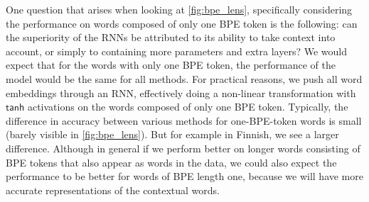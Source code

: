 \documentclass[11pt]{article}
\begin{document}
            One question that arises when looking at
     \cref{fig:bpe_lens}, specifically considering the performance on
     words composed of only one BPE token is the following: can the
     superiority of the RNNs be attributed to its ability to take
     context into account, or simply to containing more parameters
     and extra layers?
         We would expect that for the words with only one BPE token,
     the performance of the model would be the same for all
     methods. For practical reasons, we push all word embeddings
     through an RNN, effectively doing a non-linear transformation
     with $\mathsf{tanh}$ activations on the words composed of only
     one BPE token. %
                Typically, the difference in accuracy between various
     methods for one-BPE-token words is small (barely visible in
     \cref{fig:bpe_lens}). But for example in Finnish, we see a larger
     difference. Although in general if we perform better on longer
     words consisting of BPE tokens that also appear as words in the
     data, we could also expect the performance to be better for
     words of BPE length one, because we will have more accurate
     representations of the contextual words.
\end{document}
